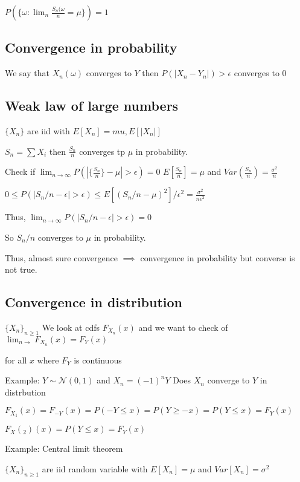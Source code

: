 \documentclass{article}
\begin{document}
$P(\{ \omega: \lim_n \frac{S_n(\omega}{n} = \mu \}) = 1$


\subsection{Convergence in probability}

We say that $X_n(\omega)$ converges to $Y$
then $P(|X_n-Y_n|)> \epsilon$ converges to 0

\subsection*{Weak law of large numbers}


$\{X_n \}$ are iid with $E[X_n] = mu, E[|X_n|]$


$S_n = \sum X_i$ then $\frac{{S_n}}{n}$ converges tp $\mu$ in probability.

Check if $\lim_{n \longrightarrow \infty} P(|\{\frac{S_n}{n}\} - \mu| > \epsilon)=0$
$E[\frac{S_n}{n}] = \mu$ and $Var(\frac{S_n}{n}) = \frac{\sigma^2}{n}$ 

$0\leq P(|S_n/n - \epsilon| > \epsilon) \leq E[(S_n/n-\mu)^2]/\epsilon^2 = \frac{\sigma^2}{n\epsilon^2} $

Thus, $ \lim_{n \longrightarrow \infty} P(|S_n/n - \epsilon| > \epsilon)  = 0$

So $S_n/n$ converges to $\mu$ in probability.


Thus, almost sure convergence $\implies$ convergence in probability 
but converse is not true.

\subsection*{Convergence in distribution}

$\{ X_n \}_{n \geq 1}$ We look at cdfs $F_{X_n}(x)$ and we want to check of $\lim_{n \longrightarrow} F_{X_n}(x) = F_Y(x)$

for all $x$ where $F_Y$ is continuous

Example: $Y \sim \mathcal{N}(0,1)$ and $X_n = (-1)^nY$ Does $X_n$ converge to $Y$ in distrbution

$F_{X_1}(x) = F_{-Y}(x) = P(-Y \leq x) = P(Y \geq -x) = P(Y \leq x) = F_Y(x)$

$F_X(_2)(x) = P(Y\leq x)  = F_Y(x)$

Example: Central limit theorem

$\{X_n\}_{n \geq 1}$ are iid random variable with $E[X_n] = \mu$ and $Var[X_n]= \sigma^2$
\end{document}
